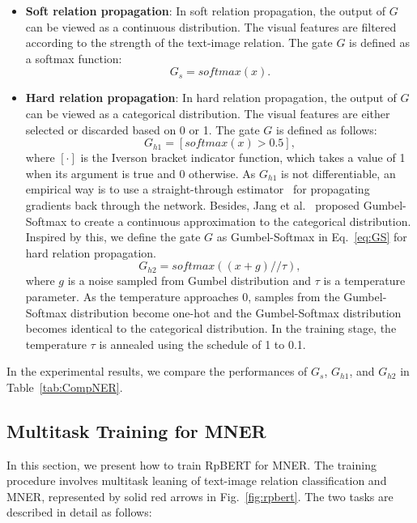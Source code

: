 \documentclass[letterpaper]{article} \usepackage{aaai21}  \usepackage{times}  \usepackage{helvet} \usepackage{courier}  \usepackage[hyphens]{url}  \usepackage{graphicx} \urlstyle{rm} \def\UrlFont{\rm}  \usepackage{natbib}  \usepackage{caption} \frenchspacing  \setlength{\pdfpagewidth}{8.5in}  \setlength{\pdfpageheight}{11in}
\begin{document}
\begin{itemize}
\item \textbf{Soft relation propagation}: 
In soft relation propagation, the output of $G$ can be viewed as a continuous distribution. 
The visual features are filtered according to the strength of the text-image relation.
The  gate $G$ is defined as a softmax function:
\begin{equation}
G_{s} = softmax(x).
\end{equation} 

\item \textbf{Hard relation propagation}:  
In hard relation propagation, the output of $G$ can be viewed as a categorical distribution. 
The visual features are either selected or discarded based on 0 or 1.
The gate $G$ is defined as follows:
\begin{equation}
G_{h1} = [softmax(x)>0.5],
\end{equation} 
where $[\cdot]$ is the Iverson bracket indicator function, which takes a value of 1 when its argument is true and 0 otherwise.
As $G_{h1} $ is not differentiable, an empirical way is to use a straight-through estimator~\cite{Bengio13estimating} for propagating  gradients back through the network.
Besides, Jang et al.~ proposed Gumbel-Softmax to create a continuous approximation to the categorical distribution. 
Inspired by this, we define the gate $G$ as Gumbel-Softmax in Eq.~\eqref{eq:GS} for hard relation propagation.
\begin{equation}
\label{eq:GS}
G_{h2} = softmax((x+g)//\tau),
\end{equation} 
where $g$ is a noise sampled from Gumbel distribution and $\tau$ is a temperature parameter. 
As the temperature approaches 0, samples from the Gumbel-Softmax distribution become one-hot and the Gumbel-Softmax distribution becomes identical to the categorical distribution. In the training stage, the temperature $\tau$ is annealed using the schedule of  1 to 0.1.
\end{itemize}
In the experimental results, we compare the performances of $G_{s}$, $G_{h1}$, and $G_{h2}$  in Table~\ref{tab:CompNER}.


\subsection{Multitask Training for MNER}
\label{sec:tasks}

In this section, we present how to train  RpBERT for MNER.
The training procedure involves multitask leaning of text-image relation classification and MNER, represented by solid red arrows in Fig.~\ref{fig:rpbert}.
The two tasks are described in detail as follows: 
\end{document}

